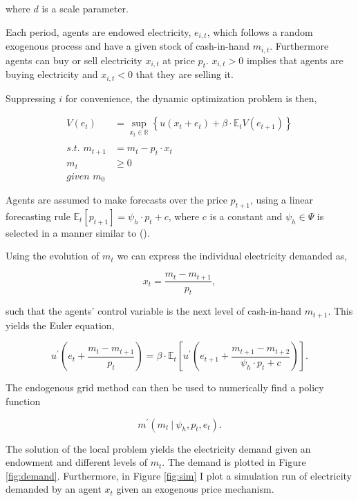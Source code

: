 \documentclass[american]{scrartcl}
\newcommand{\E}{\mathbb{E}}
\newcommand{\R}{\mathbb{R}}
\begin{document}
where $d$ is a scale parameter.

Each period, agents are endowed electricity, $e_{i, t}$, which follows a random exogenous process and have a given stock of cash-in-hand $m_{i, t}$. Furthermore agents can buy or sell electricity $x_{i, t}$ at price $p_t$. $x_{i, t} > 0$ implies that agents are buying electricity and $x_{i, t} < 0$ that they are selling it.

Suppressing $i$ for convenience, the dynamic optimization problem is then,

\begin{equation*}
	\begin{split}
		V(e_t) &= \sup_{x_t \in \R} \left\{u(x_t + e_t) + \beta \cdot \E_t V( e_{t+1} ) \right\} \\
		\\
		\textit{s.t. } m_{t+1} &= m_{t} - p_{t} \cdot x_{t}\\
		m_t  &\geq 0
		\\
		\textit{given } m_0&
	\end{split}
\end{equation*}

Agents are assumed to make forecasts over the price $p_{t+1}$, using a linear forecasting rule $\E_t[p_{t+1}] = \psi_h\cdot p_t + c$, where $c$ is a constant and $\psi_h \in \Psi$ is selected in a manner similar to \citeauthor{Hommes2013} (\citeyear{Hommes2013}).

Using the evolution of $m_t$ we can express the individual electricity demanded as,

\begin{equation}
	x_t = \frac{m_t - m_{t+1}}{p_t},
\end{equation}

such that the agents' control variable is the next level of cash-in-hand $m_{t+1}$. This yields the Euler equation,

\begin{equation}
	u^\prime\left( e_t + \frac{m_t - m_{t+1}}{p_t} \right) = \beta \cdot \E_t \left[ u^\prime\left(e_{t+1} + \frac{m_{t+1} - m_{t+2}}{ \psi_h \cdot p_t + c} \right)  \right].
\end{equation}

The endogenous grid method can then be used to numerically find a policy function

\begin{equation}
	m^\prime(m_t \ \vert \ \psi_h, p_t, e_t).
\end{equation}

The solution of the local problem yields the electricity demand given an endowment and different levels of $m_t$. The demand is plotted in Figure \ref{fig:demand}. Furthermore, in Figure \ref{fig:sim} I plot a simulation run of electricity demanded by an agent $x_t$ given an exogenous price mechanism.
\end{document}

